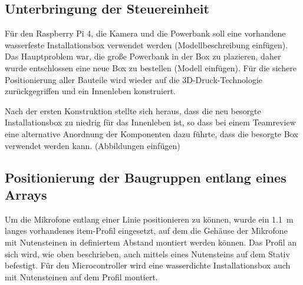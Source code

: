 \subsection{Unterbringung der Steuereinheit}

Für den Raspberry Pi 4, die Kamera und die Powerbank soll eine vorhandene wasserfeste Installationsbox verwendet werden (Modellbeschreibung einfügen). Das Hauptproblem war, die große Powerbank in der Box zu plazieren, daher wurde entschlossen eine neue Box zu bestellen (Modell einfügen). Für die sichere Positionierung aller Bauteile wird wieder auf die 3D-Druck-Technologie zurückgegriffen und ein Innenleben konstruiert.

Nach der ersten Konstruktion stellte sich heraus, dass die neu besorgte Installationsbox zu niedrig für das Innenleben ist, so dass bei einem Teamreview eine alternative Anordnung der Komponenten dazu führte, dass die besorgte Box verwendet werden kann. (Abbildungen einfügen)

\subsection{Positionierung der Baugruppen entlang eines Arrays}

Um die Mikrofone entlang einer Linie positionieren zu können, wurde ein \SI{1,1}{m} langes vorhandenes item-Profil eingesetzt, auf dem die Gehäuse der Mikrofone mit Nutensteinen in definiertem Abstand montiert werden können. Das Profil an sich wird, wie oben beschrieben, auch mittels eines Nutensteins auf dem Stativ befestigt. Für den Microcontroller wird eine wasserdichte Installationsbox auch mit Nutensteinen auf dem Profil montiert.

\newpage
